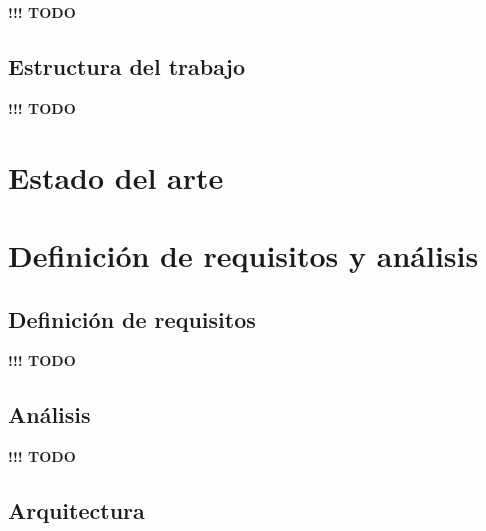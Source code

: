 \documentclass[]{article}
\begin{document}
\textbf{!!! TODO}

\subsection{Estructura del trabajo}


\textbf{!!! TODO}

\section{Estado del arte}



\section{Definición de requisitos y análisis}


\subsection{Definición de requisitos}


\textbf{!!! TODO}

\subsection{Análisis}


\textbf{!!! TODO}

\subsection{Arquitectura}
\end{document}
